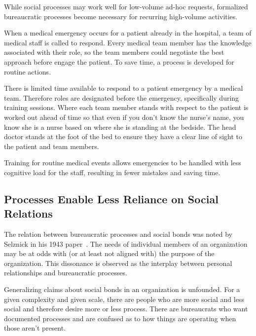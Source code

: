 While social processes may work well for low-volume ad-hoc requests, formalized bureaucratic processes become necessary for recurring high-volume activities.

\begin{mdframed}[frametitle={Emergency Medical Team},frametitlerule=true,frametitlealignment=\centering]
When a medical emergency occurs for a patient already in the hospital, a team of medical staff is called to respond. Every medical team member has the knowledge associated with their role, so the team members could negotiate the best approach before engage the patient.
To save time, a process is developed for routine actions. 

There is limited time available to respond to a patient emergency by a medical team. Therefore roles are designated before the emergency, specifically during training sessions. Where each team member stands with respect to the patient is worked out ahead of time so that even if you don't know the nurse's name, you know she is a nurse based on where she is standing at the bedside. The head doctor stands at the foot of the bed to ensure they have a clear line of sight to the patient and team members.

Training for routine medical events allows emergencies to be handled with less cognitive load for the staff, resulting in fewer mistakes and saving time. 
\end{mdframed}

\subsection*{Processes Enable Less Reliance on Social Relations}

The relation between bureaucratic processes and social bonds was noted by Selznick in his 1943 paper~\cite{1943_Selznick}. The needs of individual members of an organization may be at odds with (or at least not aligned with) the purpose of the organization. This dissonance is observed as the interplay between personal relationships and bureaucratic processes.

Generalizing claims about social bonds in an organization is unfounded. 
For a given complexity and given scale, there are people who are more social and less social and therefore desire more or less process.
There are bureaucrats who want documented processes and are confused as to how things are operating when those aren't present. 

